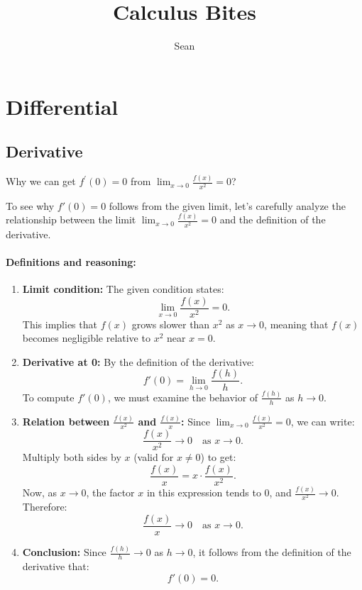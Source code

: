 \documentclass[a4paper,12pt]{book}
\begin{document}
	
\title{Calculus Bites}
\author{Sean}

\maketitle

\tableofcontents

\newpage

\chapter{Differential}

\section{Derivative}

\begin{pbox}
Why we can get \(f^{\prime}(0)=0\) from \(\lim_{x\to 0}\frac{f(x)}{x^2}=0\)?
\end{pbox}

To see why \( f'(0) = 0 \) follows from the given limit, let's carefully analyze the relationship between the limit \(\lim_{x \to 0} \frac{f(x)}{x^2} = 0\) and the definition of the derivative.

\subsubsection{Definitions and reasoning:}
\begin{enumerate}
\item 
\textbf{Limit condition:}\newline
The given condition states:
\[
\lim_{x \to 0} \frac{f(x)}{x^2} = 0.
\]
This implies that \( f(x) \) grows slower than \( x^2 \) as \( x \to 0 \), meaning that \( f(x) \) becomes negligible relative to \( x^2 \) near \( x = 0 \).

\item 
\textbf{Derivative at 0:}\newline
By the definition of the derivative:
\[
f'(0) = \lim_{h \to 0} \frac{f(h)}{h}.
\]
To compute \( f'(0) \), we must examine the behavior of \( \frac{f(h)}{h} \) as \( h \to 0 \).

\item 
\textbf{Relation between \(\frac{f(x)}{x^2}\) and \(\frac{f(x)}{x}\):}\newline
Since \(\lim_{x \to 0} \frac{f(x)}{x^2} = 0\), we can write:
\[
\frac{f(x)}{x^2} \to 0 \quad \text{as } x \to 0.
\]
Multiply both sides by \( x \) (valid for \( x \neq 0 \)) to get:
\[
\frac{f(x)}{x} = x \cdot \frac{f(x)}{x^2}.
\]
Now, as \( x \to 0 \), the factor \( x \) in this expression tends to 0, and \( \frac{f(x)}{x^2} \to 0 \). Therefore:
\[
\frac{f(x)}{x} \to 0 \quad \text{as } x \to 0.
\]

\item 
\textbf{Conclusion:}\newline
Since \( \frac{f(h)}{h} \to 0 \) as \( h \to 0 \), it follows from the definition of the derivative that:
\[
f'(0) = 0.
\]

\end{enumerate}
\end{document}
